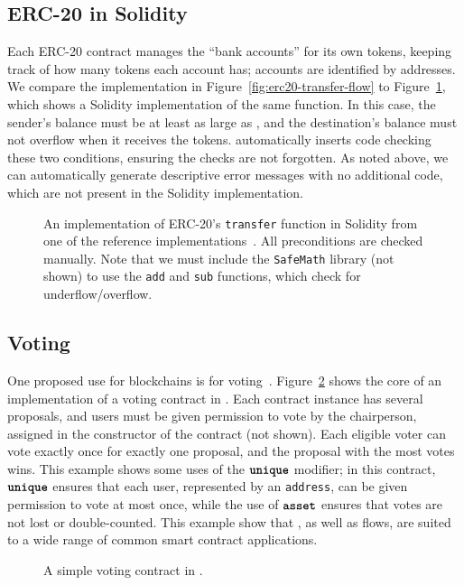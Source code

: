 \documentclass[nonacm, dvipsnames, sigconf]{acmart}
\begin{document}
\subsection{ERC-20 in Solidity}\label{sec:erc20-impl}
Each ERC-20 contract manages the ``bank accounts'' for its own tokens, keeping track of how many tokens each account has; accounts are identified by addresses.
We compare the \langName implementation in Figure~\ref{fig:erc20-transfer-flow} to Figure~\ref{fig:erc20-transfer-sol}, which shows a Solidity implementation of the same function.
In this case, the sender's balance must be at least as large as , and the destination's balance must not overflow when it receives the tokens.
\langName automatically inserts code checking these two conditions, ensuring the checks are not forgotten.
As noted above, we can automatically generate descriptive error messages with no additional code, which are not present in the Solidity implementation.
\begin{figure}
    \centering
    
    \caption{An implementation of ERC-20's \lstinline[language=Solidity]{transfer} function in Solidity from one of the reference implementations~\cite{erc20Consensys}.
        All preconditions are checked manually.
        Note that we must include the \lstinline[language=Solidity]{SafeMath} library (not shown) to use the \lstinline[language=Solidity]{add} and \lstinline[language=Solidity]{sub} functions, which check for underflow/overflow.}
    \label{fig:erc20-transfer-sol}
\end{figure}

\subsection{Voting}\label{sec:voting-impl}
One proposed use for blockchains is for voting~\cite{Elsden18:Making}.
Figure~\ref{fig:voting-impl-flow} shows the core of an implementation of a voting contract in \langName.
Each contract instance has several proposals, and users must be given permission to vote by the chairperson, assigned in the constructor of the contract (not shown).
Each eligible voter can vote exactly once for exactly one proposal, and the proposal with the most votes wins.
This example shows some uses of the $\textbf{\texttt{unique}}$ modifier; in this contract, $\textbf{\texttt{unique}}$ ensures that each user, represented by an \lstinline{address}, can be given permission to vote at most once, while the use of $\textbf{\texttt{asset}}$ ensures that votes are not lost or double-counted.
This example show that \langName, as well as flows, are suited to a wide range of common smart contract applications.
\begin{figure}
    \centering
    
    \caption{A simple voting contract in \langName.}
    \label{fig:voting-impl-flow}
\end{figure}
\end{document}
